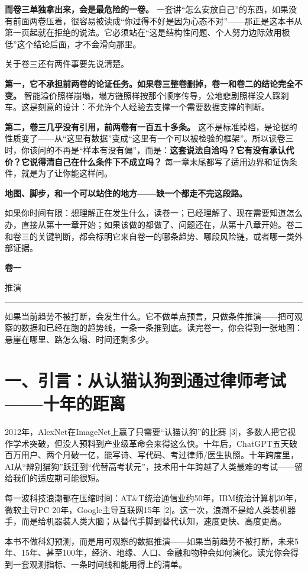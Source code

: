 \documentclass[11pt,a4paper]{ctexart}
\newcommand{\volumepage}[3]{%
  \clearpage
  \thispagestyle{empty}
  \vspace*{0.32\textheight}
  \begin{center}
    {\Huge\bfseries #1\par}
    \vspace{0.9em}
    {\Large\color{subtitlecolor} #2\par}
    \vspace{1.6em}
    \rule{0.34\textwidth}{0.6pt}\par
    \vspace{1.6em}
    \begin{minipage}{0.74\textwidth}
      \centering\large\color{subtitlecolor} #3
    \end{minipage}
  \end{center}
  \clearpage
  \phantomsection
  \addcontentsline{toc}{section}{\protect\textbf{#1\ \textperiodcentered\ #2}}
}
\begin{document}
\textbf{而卷三单独拿出来，会是最危险的一卷。} 一套讲“怎么安放自己”的东西，如果没有前面两卷压着，很容易被读成“你过得不好是因为心态不对”——那正是这本书从第一页起就在拒绝的说法。它必须站在“这是结构性问题、个人努力边际效用极低”这个结论后面，才不会滑向那里。

关于卷三还有两件事要先说清楚。

\textbf{第一，它不承担前两卷的论证任务。如果卷三整卷删掉，卷一和卷二的结论完全不变。} 智能溢价照样崩塌，塌方链照样按那个顺序传导，公地悲剧照样没人踩刹车。这是刻意的设计：不允许个人经验去支撑一个需要数据支撑的判断。

\textbf{第二，卷三几乎没有引用，前两卷有一百五十多条。} 这不是标准掉档，是论据的性质变了——从“这里有数据”变成“这里有一个可以被检验的框架”。所以读卷三时，你该问的不再是“样本有没有偏”，而是：\textbf{这套说法自洽吗？它有没有承认代价？它说得清自己在什么条件下不成立吗？} 每一章末尾都写了适用边界和证伪条件，就是为了让你能这样问。

\textbf{地图、脚步，和一个可以站住的地方——缺一个都走不完这段路。}

如果你时间有限：想理解正在发生什么，读卷一；已经理解了、现在需要知道怎么办，直接从第十一章开始；如果该做的都做了、问题还在，从第十八章开始。卷二和卷三的关键判断，都会标明它来自卷一的哪条趋势、哪段风险链，或者哪一类外部证据。

\volumepage{卷一}{推演}{如果当前趋势不被打断，会发生什么。它不做单点预言，只做条件推演——把可观察的数据和已经在跑的趋势线，一条一条推到底。读完卷一，你会得到一张地图：悬崖在哪里、路怎么塌、时间还剩多少。}

\section{一、引言：从认猫认狗到通过律师考试——十年的距离}

2012年，AlexNet在ImageNet上赢了只需要“认猫认狗”的比赛 [3]，多数人把它视作学术突破，但没人预料到产业级革命会来得这么快。十年后，ChatGPT五天破百万用户、两个月破一亿，能写诗、写代码、考过律师/医生执照。十年跨度里，AI从“辨别猫狗”跃迁到“代替高考状元”，技术用十年跨越了人类最难的考试——留给我们的适应期可能很短。

每一波科技浪潮都在压缩时间：AT\&T统治通信业约50年，IBM统治计算机30年，微软主导PC 20年，Google主导互联网15年 [2]。这一次，浪潮不是给人类装机器手，而是给机器装人类大脑；从替代手脚到替代认知，速度更快、高度更高。

本书不做科幻预测，而是用可观察的数据推演——如果当前趋势不被打断，未来5年、15年、甚至100年，经济、地缘、人口、金融和物种会如何演化。读完你会得到一套观测指标、一条时间线和能用得上的清单。
\end{document}
